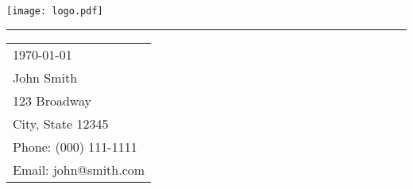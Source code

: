 \documentclass{article}
\begin{document}

\texttt{[image: logo.pdf]} %

\vspace{-1em} %

\rule{\linewidth}{1pt} %

\bigskip\bigskip %


\hfill
\begin{tabular}{l @{}}
	\today \bigskip\\ %
	John Smith \\
	123 Broadway \\ %
	City, State 12345 \\
	Phone: (000) 111-1111 \\
	Email: john@smith.com
\end{tabular}

\bigskip %
\end{document}
